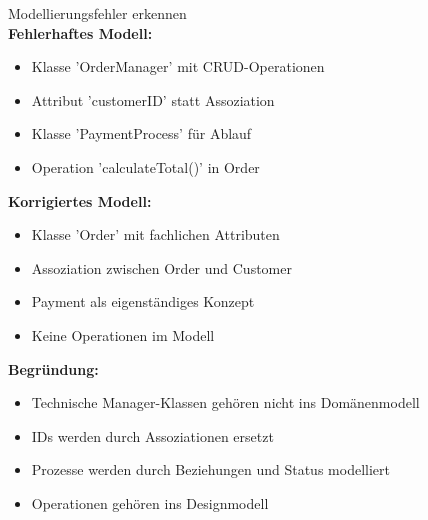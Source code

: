 \begin{example2}{Modellierungsfehler erkennen}\\
\textbf{Fehlerhaftes Modell:}
\begin{itemize}
    \item Klasse 'OrderManager' mit CRUD-Operationen
    \item Attribut 'customerID' statt Assoziation
    \item Klasse 'PaymentProcess' für Ablauf
    \item Operation 'calculateTotal()' in Order
\end{itemize}

\textbf{Korrigiertes Modell:}
\begin{itemize}
    \item Klasse 'Order' mit fachlichen Attributen
    \item Assoziation zwischen Order und Customer
    \item Payment als eigenständiges Konzept
    \item Keine Operationen im Modell
\end{itemize}

\textbf{Begründung:}
\begin{itemize}
    \item Technische Manager-Klassen gehören nicht ins Domänenmodell
    \item IDs werden durch Assoziationen ersetzt
    \item Prozesse werden durch Beziehungen und Status modelliert
    \item Operationen gehören ins Designmodell
\end{itemize}
\end{example2}